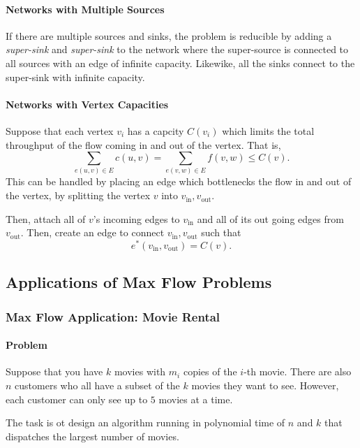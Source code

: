 \paragraph{Networks with Multiple Sources}
If there are multiple sources and sinks, the problem is reducible by
adding a \textit{super-sink} and \textit{super-sink} to the network
where the super-source is connected to all sources with an edge of infinite
capacity. Likewike, all the sinks connect to the super-sink with infinite
capacity.

\paragraph{Networks with Vertex Capacities}
Suppose that each vertex \(v_i\) has a capcity \(C(v_i)\) which limits the total
throughput of the flow coming in and out of the vertex.
That is, \[
  \sum_{e(u, v) \in E} c(u, v) = \sum_{e(v, w)\in E}f(v, w) \leq C(v)
.\] 
This can be handled by placing an edge which bottlenecks the flow in and out of
the vertex, by splitting the vertex \(v\) into  \(v_{\mathrm{in}}, v_{\mathrm{out}}\).

Then, attach all of \(v\)'s incoming edges to \(v_{\mathrm{in}}\) and all of
its out going edges from  \(v_{\mathrm{out}}\).
Then, create an edge to connect  \(v_{\mathrm{in}}, v_{\mathrm{out}}\) such that  \[
  e^*(v_{\mathrm{in}}, v_{\mathrm{out}}) = C(v)
.\] 

\subsection{Applications of Max Flow Problems}

\subsubsection{Max Flow Application: Movie Rental}

\paragraph{Problem}
Suppose that you have \(k\) movies with  \(m_i\) copies of the \(i\)-th movie.
There are also \(n\) customers who all have a subset of the  \(k\)
movies they want to see. However, each customer can only see up to \(5\) 
movies at a time.

The task is ot design an algorithm running in polynomial time of \(n\) and
\(k\) that dispatches the largest number of movies.

